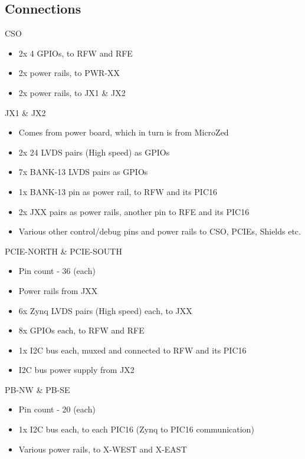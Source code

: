 \documentclass{beamer}
\begin{document}
\subsection{Connections}

\begin{frame}{CSO}
    \begin{itemize}
    \item 2x 4 GPIOs, to RFW and RFE 
    \item 2x power rails, to PWR-XX
    \item 2x power rails, to JX1 \& JX2
    \end{itemize}
\end{frame}

\begin{frame}{JX1 \& JX2}
    \begin{itemize}
    \item Comes from power board, which in turn is from MicroZed
    \item 2x 24 LVDS pairs (High speed) as GPIOs
    \item 7x BANK-13 LVDS pairs as GPIOs
    \item 1x BANK-13 pin as power rail, to RFW and its PIC16
    \item 2x JXX pairs as power rails, another pin to RFE and its PIC16
    \item Various other control/debug pins and power rails to CSO, PCIEs, Shields etc.
    \end{itemize}
\end{frame}

\begin{frame}{PCIE-NORTH \& PCIE-SOUTH}
    \begin{itemize}
    \item Pin count - 36 (each)
    \item Power rails from JXX
    \item 6x Zynq LVDS pairs (High speed) each, to JXX
    \item 8x GPIOs each, to RFW and RFE 
    \item 1x I2C bus each, muxed and connected to RFW and its PIC16
    \item I2C bus power supply from JX2
    \end{itemize}
\end{frame}

\begin{frame}{PB-NW \& PB-SE}
    \begin{itemize}
    \item Pin count - 20 (each)
    \item 1x I2C bus each, to each PIC16 (Zynq to PIC16 communication)
    \item Various power rails, to X-WEST and X-EAST
    \end{itemize}
\end{frame}
\end{document}
